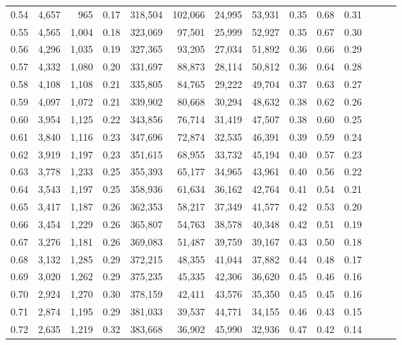 \begin{tabular}{rrrrrrrrrrrrrr}
0.54 &  4,657 &    965 &  0.17 &  318,504 &  102,066 &  24,995 &  53,931 &  0.35 &  0.68 &      0.31 \\
0.55 &  4,565 &  1,004 &  0.18 &  323,069 &   97,501 &  25,999 &  52,927 &  0.35 &  0.67 &      0.30 \\
0.56 &  4,296 &  1,035 &  0.19 &  327,365 &   93,205 &  27,034 &  51,892 &  0.36 &  0.66 &      0.29 \\
0.57 &  4,332 &  1,080 &  0.20 &  331,697 &   88,873 &  28,114 &  50,812 &  0.36 &  0.64 &      0.28 \\
0.58 &  4,108 &  1,108 &  0.21 &  335,805 &   84,765 &  29,222 &  49,704 &  0.37 &  0.63 &      0.27 \\
0.59 &  4,097 &  1,072 &  0.21 &  339,902 &   80,668 &  30,294 &  48,632 &  0.38 &  0.62 &      0.26 \\
0.60 &  3,954 &  1,125 &  0.22 &  343,856 &   76,714 &  31,419 &  47,507 &  0.38 &  0.60 &      0.25 \\
0.61 &  3,840 &  1,116 &  0.23 &  347,696 &   72,874 &  32,535 &  46,391 &  0.39 &  0.59 &      0.24 \\
0.62 &  3,919 &  1,197 &  0.23 &  351,615 &   68,955 &  33,732 &  45,194 &  0.40 &  0.57 &      0.23 \\
0.63 &  3,778 &  1,233 &  0.25 &  355,393 &   65,177 &  34,965 &  43,961 &  0.40 &  0.56 &      0.22 \\
0.64 &  3,543 &  1,197 &  0.25 &  358,936 &   61,634 &  36,162 &  42,764 &  0.41 &  0.54 &      0.21 \\
0.65 &  3,417 &  1,187 &  0.26 &  362,353 &   58,217 &  37,349 &  41,577 &  0.42 &  0.53 &      0.20 \\
0.66 &  3,454 &  1,229 &  0.26 &  365,807 &   54,763 &  38,578 &  40,348 &  0.42 &  0.51 &      0.19 \\
0.67 &  3,276 &  1,181 &  0.26 &  369,083 &   51,487 &  39,759 &  39,167 &  0.43 &  0.50 &      0.18 \\
0.68 &  3,132 &  1,285 &  0.29 &  372,215 &   48,355 &  41,044 &  37,882 &  0.44 &  0.48 &      0.17 \\
0.69 &  3,020 &  1,262 &  0.29 &  375,235 &   45,335 &  42,306 &  36,620 &  0.45 &  0.46 &      0.16 \\
0.70 &  2,924 &  1,270 &  0.30 &  378,159 &   42,411 &  43,576 &  35,350 &  0.45 &  0.45 &      0.16 \\
0.71 &  2,874 &  1,195 &  0.29 &  381,033 &   39,537 &  44,771 &  34,155 &  0.46 &  0.43 &      0.15 \\
0.72 &  2,635 &  1,219 &  0.32 &  383,668 &   36,902 &  45,990 &  32,936 &  0.47 &  0.42 &      0.14 \\

\end{tabular}
